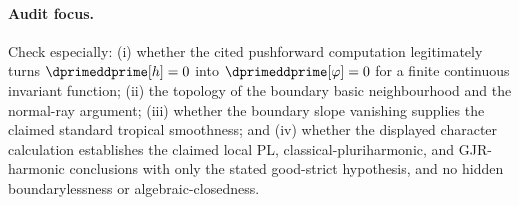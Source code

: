 \paragraph{Audit focus.}
Check especially: (i) whether the cited pushforward computation legitimately turns $\dprimeddprime[h]=0$ into $\dprimeddprime[\varphi]=0$ for a finite continuous invariant function; (ii) the topology of the boundary basic neighbourhood and the normal-ray argument; (iii) whether the boundary slope vanishing supplies the claimed standard tropical smoothness; and (iv) whether the displayed character calculation establishes the claimed local PL, classical-pluriharmonic, and GJR-harmonic conclusions with only the stated good-strict hypothesis, and no hidden boundarylessness or algebraic-closedness.
